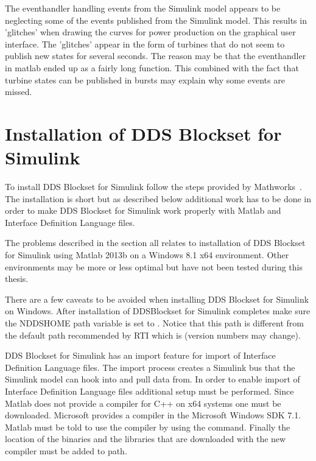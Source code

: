 The eventhandler handling events from the Simulink model appears to be neglecting some of the events published from the Simulink model. This results in 'glitches' when drawing the curves for power production on the graphical user interface. The 'glitches' appear in the form of turbines that do not seem to publish new states for several seconds. The reason may be that the eventhandler in matlab ended up as a fairly long function. This combined with the fact that turbine states can be published in bursts may explain why some events are missed. 

\section{Installation of DDS Blockset for Simulink}
To install DDS Blockset for Simulink follow the steps provided by Mathworks~\cite{DDSBlocksetPilotSupportPackageUserGuide}. The installation is short but as described below additional work has to be done in order to make DDS Blockset for Simulink work properly with Matlab and Interface Definition Language files.

The problems described in the section all relates to installation of DDS Blockset for Simulink using Matlab 2013b on a Windows 8.1 x64 environment.
Other environments may be more or less optimal but have not been tested during this thesis.

There are a few caveats to be avoided when installing DDS Blockset for Simulink on Windows.
After installation of DDSBlockset for Simulink completes make sure the NDDSHOME path variable is set to .
Notice that this path is different from the default path recommended by RTI which is  (version numbers may change).

DDS Blockset for Simulink has an import feature for import of Interface Definition Language files. The import process creates a Simulink bus that the Simulink model can hook into and pull data from. In order to enable import of Interface Definition Language files additional setup must be performed.
Since Matlab does not provide a compiler for C++ on x64 systems one must be downloaded. Microsoft provides a compiler in the Microsoft Windows SDK 7.1. Matlab must be told to use the compiler by using the  command. Finally the location of the binaries and the libraries that are downloaded with the new compiler must be added to path.

